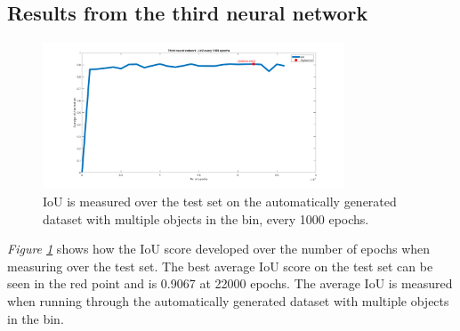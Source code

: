 \subsection{Results from the third neural network}
\begin{figure}[h]
 \centering
 \includegraphics[width=0.8\textwidth, trim={5cm 0 4cm 0},clip]{graphics/results/thirdneuralnetwork.png}
 \caption{IoU is measured over the test set on the automatically generated dataset with multiple objects in the bin, every 1000 epochs.}
 \label{fig:v3neuralnetwork}
\end{figure}
\textit{Figure \ref{fig:v3neuralnetwork}} shows how the IoU score developed over the number of epochs when measuring over the test set. The best average IoU score on the test set can be seen in the red point and is 0.9067 at 22000 epochs. The average IoU is measured when running through the automatically generated dataset with multiple objects in the bin.


